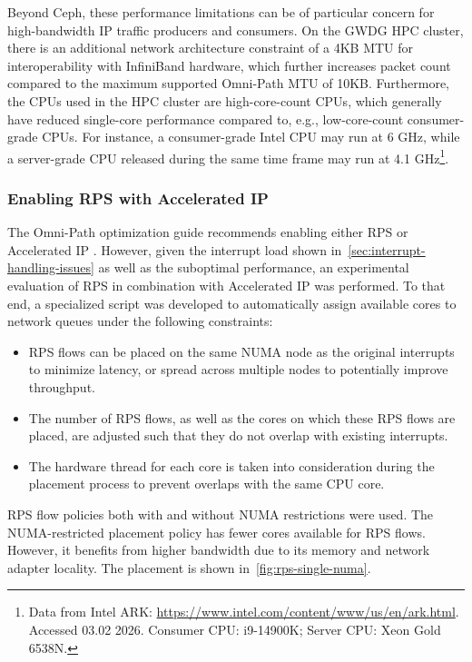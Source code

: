 Beyond Ceph, these performance limitations can be of particular concern for high-bandwidth \ac{IP} traffic producers and consumers. On the \ac{GWDG} \ac{HPC} cluster, there is an additional network architecture constraint of a 4KB \ac{MTU} for interoperability with InfiniBand hardware, which further increases packet count compared to the maximum supported Omni-Path \ac{MTU} of 10KB. Furthermore, the \acp{CPU} used in the \ac{HPC} cluster are high-core-count \acp{CPU}, which generally have reduced single-core performance compared to, e.g., low-core-count consumer-grade \acp{CPU}. For instance, a consumer-grade Intel \ac{CPU} may run at 6 GHz, while a server-grade \ac{CPU} released during the same time frame may run at 4.1 GHz\footnote{Data from Intel ARK: \url{https://www.intel.com/content/www/us/en/ark.html}. Accessed 03.02 2026. Consumer \acs{CPU}: i9-14900K; Server \acs{CPU}: Xeon Gold 6538N.}.

\subsubsection{Enabling \acs{RPS} with Accelerated \acs{IP}}

The Omni-Path optimization guide recommends enabling either \ac{RPS} or
Accelerated \ac{IP} \cite[p.~77]{omni-path-tuning-guide}. However, given the
interrupt load shown in~\cref{sec:interrupt-handling-issues} as well as the
suboptimal performance, an experimental evaluation of \ac{RPS} in combination
with Accelerated \ac{IP} was performed. To that end, a specialized script was
developed to automatically assign available cores to network queues under the
following constraints:

\begin{itemize}
    \item \ac{RPS} flows can be placed on the same \ac{NUMA} node as the original interrupts to minimize latency, or spread across multiple nodes to potentially improve throughput.
    \item The number of \ac{RPS} flows, as well as the cores on which these \ac{RPS} flows are placed, are adjusted such that they do not overlap with existing interrupts.
    \item The hardware thread for each core is taken into consideration during the placement process to prevent overlaps with the same \ac{CPU} core.
\end{itemize}

\ac{RPS}
flow policies both with and without \ac{NUMA} restrictions were used. The
\ac{NUMA}-restricted placement policy has fewer cores available for \ac{RPS}
flows. However, it benefits from higher bandwidth due to its memory and network
adapter locality. The placement is shown in~\cref{fig:rps-single-numa}.

